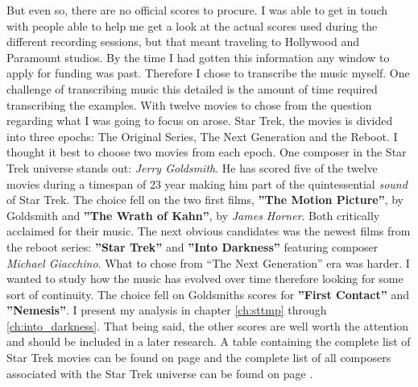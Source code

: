 But even so, there are no official scores to procure. I was able to get in touch with people able to help me get a look at the actual scores used during the different recording sessions, but that meant traveling to Hollywood and Paramount studios. By the time I had gotten this information any window to apply for funding was past. Therefore I chose to transcribe the music myself. One challenge of transcribing music this detailed is the amount of time required transcribing the examples. With twelve movies to chose from the question regarding what I was going to focus on arose. Star Trek, the movies is divided into three epochs: The Original Series, The Next Generation and the Reboot. I thought it best to choose two movies from each epoch. One composer in the Star Trek universe stands out: \textit{Jerry Goldsmith}. He has scored five of the twelve movies during a timespan of 23 year making him part of the quintessential \textit{sound} of Star Trek. The choice fell on the two first films, \textbf{''The Motion Picture''}, by Goldsmith and \textbf{''The Wrath of Kahn''}, by \textit{James Horner}. Both critically acclaimed for their music. The next obvious candidates was the newest films from the reboot series: \textbf{''Star Trek''} and \textbf{''Into Darkness''} featuring composer \textit{Michael Giacchino}. What to chose from ``The Next Generation'' era was harder. I wanted to study how the music has evolved over time therefore looking for some sort of continuity. The choice fell on Goldsmiths scores for \textbf{''First Contact''} and \textbf{''Nemesis''}. I present my analysis in chapter \ref{ch:sttmp} through \ref{ch:into_darkness}. That being said, the other scores are well worth the attention and should be included in a later research. A table containing the complete list of Star Trek movies can be found on page \pageref{tb:filmography} and the complete list of all composers associated with the Star Trek universe can be found on page \pageref{tb:star trek composers}.


